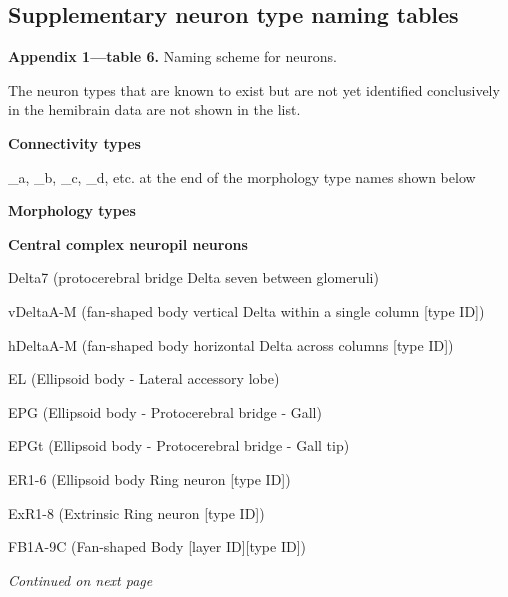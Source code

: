 \documentclass{article}
\begin{document}
\subsection*{Supplementary neuron type naming tables}

\noindent\textbf{Appendix 1—table 6.} Naming scheme for neurons.

\noindent The neuron types that are known to exist but are not yet identified conclusively in the hemibrain data are not shown in the list.

{\footnotesize
\noindent\textbf{Connectivity types}\par
\noindent\hspace*{1.0em}\_a, \_b, \_c, \_d, etc. at the end of the morphology type names shown below\par
\noindent\textbf{Morphology types}\par
\noindent\textbf{Central complex neuropil neurons}\par
\noindent\hspace*{1.0em}Delta7 (protocerebral bridge Delta seven between glomeruli)\par
\noindent\hspace*{1.0em}vDeltaA-M (fan-shaped body vertical Delta within a single column [type ID])\par
\noindent\hspace*{1.0em}hDeltaA-M (fan-shaped body horizontal Delta across columns [type ID])\par
\noindent\hspace*{1.0em}EL (Ellipsoid body - Lateral accessory lobe)\par
\noindent\hspace*{1.0em}EPG (Ellipsoid body - Protocerebral bridge - Gall)\par
\noindent\hspace*{1.0em}EPGt (Ellipsoid body - Protocerebral bridge - Gall tip)\par
\noindent\hspace*{1.0em}ER1-6 (Ellipsoid body Ring neuron [type ID])\par
\noindent\hspace*{1.0em}ExR1-8 (Extrinsic Ring neuron [type ID])\par
\noindent\hspace*{1.0em}FB1A-9C (Fan-shaped Body [layer ID][type ID])\par
}
\noindent\emph{Continued on next page}
\end{document}
